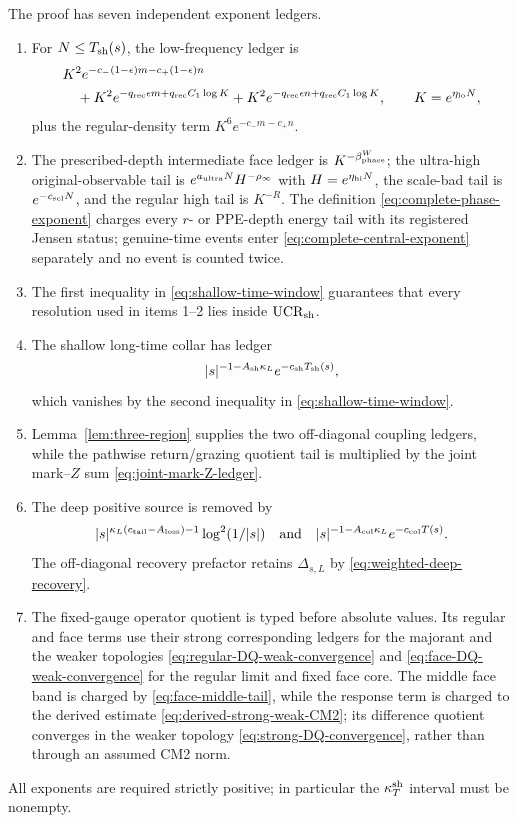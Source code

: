 \documentclass[11pt]{article}
\begin{document}
The proof has seven independent exponent ledgers.
\begin{enumerate}[label=\textup{(A\arabic*)}]
\item For $N\le T_{\rm sh}(s)$, the low-frequency ledger is
\begin{align*}
 &K^2e^{-c_-(1-\epsilon)m-c_+(1-\epsilon)n}\\
 &\quad+K^2e^{-q_{\rm rec}\epsilon m+q_{\rm rec}C_1\log K}
 +K^2e^{-q_{\rm rec}\epsilon n+q_{\rm rec}C_1\log K},
 \qquad K=e^{\eta_{\rm lo}N},
\end{align*}
plus the regular-density term $K^6e^{-c_-m-c_+n}$.
\item The prescribed-depth intermediate face ledger is
$K^{-\beta_{\rm phase}^{W}}$; the ultra-high original-observable tail is
$e^{a_{\rm ultra}N}H^{-\rho_\infty}$ with
$H=e^{\eta_{\rm hi}N}$, the scale-bad tail is $e^{-c_{\rm scl}N}$, and the
regular high tail is $K^{-R}$.  The definition
\eqref{eq:complete-phase-exponent} charges every $r$- or PPE-depth energy
tail with its registered Jensen status; genuine-time events enter
\eqref{eq:complete-central-exponent} separately and no event is counted
twice.
\item The first inequality in \eqref{eq:shallow-time-window} guarantees
that every resolution used in items 1--2 lies inside
$\mathrm{UCR}_{\rm sh}$.
\item The shallow long-time collar has ledger
\[
 |s|^{-1-A_{\rm sh}\kappa_L}
 e^{-c_{\rm sh}T_{\rm sh}(s)},
\]
which vanishes by the second inequality in
\eqref{eq:shallow-time-window}.
\item Lemma~\ref{lem:three-region} supplies the two off-diagonal coupling
ledgers, while the pathwise return/grazing quotient tail is multiplied by
the joint mark--$Z$ sum \eqref{eq:joint-mark-Z-ledger}.
\item The deep positive source is removed by
\[
 |s|^{\kappa_L(c_{\rm tail}-A_{\rm loss})-1}\log^2(1/|s|)
 \quad\hbox{and}\quad
 |s|^{-1-A_{\rm col}\kappa_L}e^{-c_{\rm col}T(s)}.
\]
The off-diagonal recovery prefactor retains $\Delta_{s,L}$ by
\eqref{eq:weighted-deep-recovery}.
\item The fixed-gauge operator quotient is typed before absolute values.  Its
regular and face terms use their strong corresponding ledgers for the
majorant and the weaker topologies
\eqref{eq:regular-DQ-weak-convergence} and
\eqref{eq:face-DQ-weak-convergence} for the regular limit and fixed face
core.  The middle face band is charged by
\eqref{eq:face-middle-tail}, while the
response term is charged to the derived estimate
\eqref{eq:derived-strong-weak-CM2}; its difference quotient converges in the
weaker topology \eqref{eq:strong-DQ-convergence}, rather than through an
assumed CM2 norm.
\end{enumerate}
All exponents are required strictly positive; in particular the
$\kappa_T^{\rm sh}$ interval must be nonempty.
\end{document}
